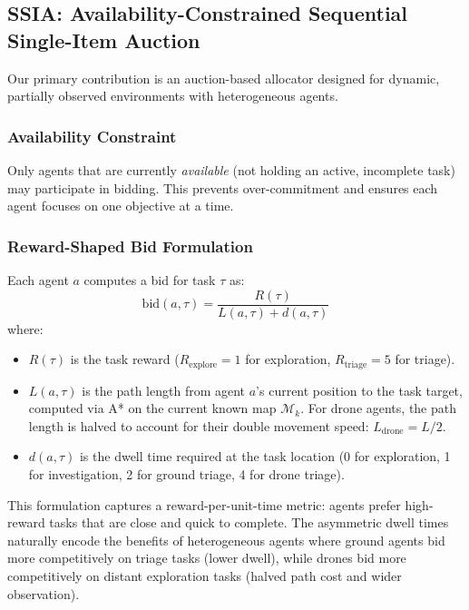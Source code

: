 \documentclass[conference]{IEEEtran}
\begin{document}
\subsection{SSIA: Availability-Constrained Sequential Single-Item Auction}

Our primary contribution is an auction-based allocator designed for dynamic, partially observed environments with heterogeneous agents.

\subsubsection{Availability Constraint}
Only agents that are currently \emph{available} (not holding an active, incomplete task) may participate in bidding. This prevents over-commitment and ensures each agent focuses on one objective at a time.

\subsubsection{Reward-Shaped Bid Formulation}
Each agent $a$ computes a bid for task $\tau$ as:
\begin{equation}
    \text{bid}(a, \tau) = \frac{R(\tau)}{L(a, \tau) + d(a, \tau)}
    \label{eq:bid}
\end{equation}
where:
\begin{itemize}
    \item $R(\tau)$ is the task reward ($R_{\text{explore}} = 1$ for exploration, $R_{\text{triage}} = 5$ for triage).
    \item $L(a, \tau)$ is the path length from agent $a$'s current position to the task target, computed via A* on the current known map $\mathcal{M}_k$. For drone agents, the path length is halved to account for their double movement speed: $L_{\text{drone}} = L / 2$.
    \item $d(a, \tau)$ is the dwell time required at the task location (0 for exploration, 1 for investigation, 2 for ground triage, 4 for drone triage).
\end{itemize}

This formulation captures a reward-per-unit-time metric: agents prefer high-reward tasks that are close and quick to complete. The asymmetric dwell times naturally encode the benefits of heterogeneous agents where ground agents bid more competitively on triage tasks (lower dwell), while drones bid more competitively on distant exploration tasks (halved path cost and wider observation).
\end{document}
